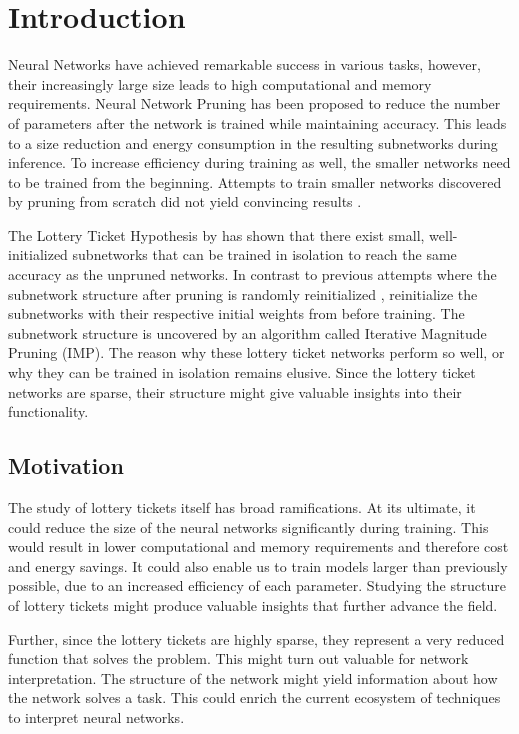 \chapter{Introduction}
Neural Networks have achieved remarkable success in various tasks, however, their increasingly large size leads to high computational and memory requirements.
Neural Network Pruning \autocite{LeCun, OptimalBrainSurgeon, HanEtAl15, PruningFiltersForEfficientConvets} has been proposed to reduce the number of parameters after the network is trained while maintaining accuracy.
This leads to a size reduction \autocite{HanEtAl15} and energy consumption \autocite{YangCS17} in the resulting subnetworks during inference.
To increase efficiency during training as well, the smaller networks need to be trained from the beginning. Attempts to train smaller networks discovered by pruning from scratch did not yield convincing results \autocite{HanEtAl15, PruningFiltersForEfficientConvets}.

The Lottery Ticket Hypothesis by \textcite{LTH} has shown that there exist small, well-initialized subnetworks that can be trained in isolation to reach the same accuracy as the unpruned networks. 
In contrast to previous attempts where the subnetwork structure after pruning is randomly reinitialized \autocite{HanEtAl15, PruningFiltersForEfficientConvets}, \textcite{LTH} reinitialize the subnetworks with their respective initial weights from before training.
The subnetwork structure is uncovered by an algorithm called Iterative Magnitude Pruning (IMP).
The reason why these lottery ticket networks perform so well, or why they can be trained in isolation remains elusive.
Since the lottery ticket networks are sparse, their structure might give valuable insights into their functionality.

\section{Motivation}
The study of lottery tickets itself has broad ramifications.
At its ultimate, it could reduce the size of the neural networks significantly during training.
This would result in lower computational and memory requirements and therefore cost and energy savings.
It could also enable us to train models larger than previously possible, due to an increased efficiency of each parameter.
Studying the structure of lottery tickets might produce valuable insights that further advance the field.

Further, since the lottery tickets are highly sparse, they represent a very reduced function that solves the problem.
This might turn out valuable for network interpretation.
The structure of the network might yield information about how the network solves a task.
This could enrich the current ecosystem of techniques to interpret neural networks.

